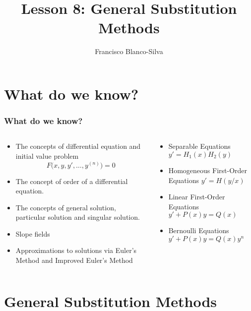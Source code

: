 \documentclass[9pt,xcolor=x11names,compress]{beamer}
\author[Francisco Blanco-Silva]{Francisco Blanco-Silva}
\institute[USC]{University of South Carolina}
\date{
	\begin{tikzpicture}[decoration=Koch curve type 1] 
		\draw[DeepSkyBlue4] decorate{ decorate{ decorate{ (0,1) -- (3,0) -- (5,1)}}}; 
	\end{tikzpicture}  
	\\
	\today
}
\title{Lesson 8: General Substitution Methods}
\begin{document}
\frame{\titlepage}

\section{What do we know?}
\begin{frame}\frametitle{What do we know?}
\begin{columns}[T]
\begin{column}{0.6\linewidth}
\begin{itemize}
\item The concepts of \alert<1>{differential equation} and \alert<1>{initial value problem}
\begin{equation*}
F\big(x,y,y',\dotsc,y^{(n)}\big)=0
\end{equation*}
\item The concept of \alert<1>{order} of a differential equation.
\item The concepts of \alert<1>{general solution}, \alert<1>{particular solution} and \alert<1>{singular solution}.
\item \alert<1>{Slope fields}
\item Approximations to solutions via \alert<1>{Euler's Method} and \alert<1>{Improved Euler's Method}
\end{itemize} 
\end{column}
\begin{column}{0.4\linewidth}
\begin{itemize}
\item Separable Equations $y'=H_1(x) H_2(y)$
\item \alert<2>{Homogeneous First-Order Equations $y'=H(y/x)$}
\item Linear First-Order Equations $y'+P(x)y=Q(x)$
\item \alert<2>{Bernoulli Equations $y'+P(x)y=Q(x)y^n$}
\end{itemize}
\end{column}
\end{columns}
\end{frame}

\section{General Substitution Methods}
\end{document}
